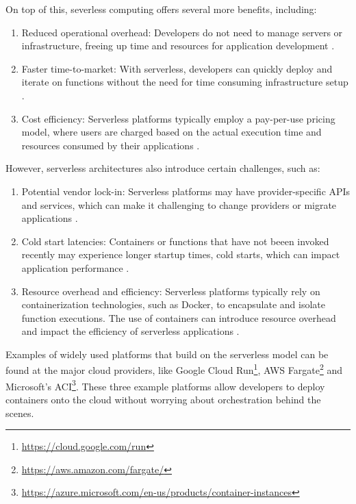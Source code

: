 \documentclass[
  table]{report}
\providecommand{\tightlist}{%
  \setlength{\itemsep}{0pt}\setlength{\parskip}{0pt}}
\begin{document}
On top of this, severless computing offers several more benefits,
including:

\begin{enumerate}
\def\labelenumi{\arabic{enumi}.}
\tightlist
\item
  Reduced operational overhead: Developers do not need to manage servers
  or infrastructure, freeing up time and resources for application
  development \citep{baldiniServerlessComputingCurrent2017}.
\item
  Faster time-to-market: With serverless, developers can quickly deploy
  and iterate on functions without the need for time consuming
  infrastructure setup \citep{adzicServerlessComputingEconomic2017}.
\item
  Cost efficiency: Serverless platforms typically employ a pay-per-use
  pricing model, where users are charged based on the actual execution
  time and resources consumed by their applications
  \citep{eismannReviewServerlessUse2021}.
\end{enumerate}

However, serverless architectures also introduce certain challenges,
such as:

\begin{enumerate}
\def\labelenumi{\arabic{enumi}.}
\tightlist
\item
  Potential vendor lock-in: Serverless platforms may have
  provider-specific APIs and services, which can make it challenging to
  change providers or migrate applications
  \citep{gottliebServerlessDataLockin2018}.
\item
  Cold start latencies: Containers or functions that have not beeen
  invoked recently may experience longer startup times, cold starts,
  which can impact application performance
  \citep{golecColdStartLatency2023}.
\item
  Resource overhead and efficiency: Serverless platforms typically rely
  on containerization technologies, such as Docker, to encapsulate and
  isolate function executions. The use of containers can introduce
  resource overhead and impact the efficiency of serverless applications
  \citep{akkusSANDHighPerformanceServerless2018}.
\end{enumerate}

Examples of widely used platforms that build on the serverless model can
be found at the major cloud providers, like Google Cloud Run\footnote{\url{https://cloud.google.com/run}},
\ac{AWS} Fargate\footnote{\url{https://aws.amazon.com/fargate/}} and
Microsoft's \ac{ACI}\footnote{\url{https://azure.microsoft.com/en-us/products/container-instances}}.
These three example platforms allow developers to deploy containers onto
the cloud without worrying about orchestration behind the scenes.
\end{document}
